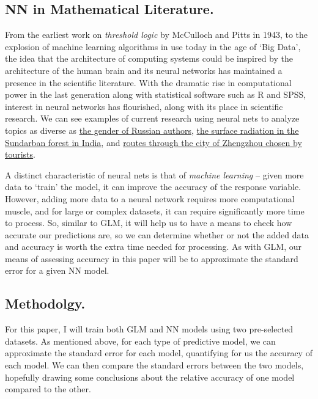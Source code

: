 \documentclass[12pt]{article}
\begin{document}
	\subsection{NN in Mathematical Literature.}
		From the earliest work on \textit{threshold logic} by McCulloch and Pitts in 1943, to the explosion of machine learning algorithms
in use today in the age of `Big Data', the idea that the architecture of computing systems could be inspired by the architecture of the human brain
and its neural networks has maintained a presence in the scientific literature.  With the dramatic rise in computational power in the last 
generation along with statistical software such as R and SPSS, interest in neural networks has flourished, along with its place in scientific
research.  We can see examples of current research using neural nets to analyze topics as diverse as 
\href{https://www.sciencedirect.com/science/article/pii/S1877050918300656}{the gender of Russian authors},
\href{https://www.sciencedirect.com/science/article/pii/S2468203916300024}{the surface radiation in the Sundarban forest in India}, and 
\href{https://www.sciencedirect.com/science/article/pii/S1877050917303617}{routes through the city of Zhengzhou chosen by tourists}.

		
A distinct characteristic of neural nets is that of \textit{machine learning} -- given more data to `train' the model, it can improve the accuracy
of the response variable.  However, adding more data to a neural network requires more computational muscle, and for large or complex datasets,
it can require significantly more time to process.  So, similar to GLM, it will help us to have a means to check how accurate our predictions are,
so we can determine whether or not the added data and accuracy is worth the extra time needed for processing.  As with GLM, our means of assessing
accuracy in this paper will be to approximate the standard error for a given NN model.


	\subsection{Methodolgy.}
		For this paper, I will train both GLM and NN models using two pre-selected datasets.  As mentioned above, for each type of
predictive model, we can approximate the standard error for each model, quantifying for us the accuracy of each model.  We can then compare the 
standard errors between the two models, hopefully drawing some conclusions about the relative accuracy of one model compared to the other.
\end{document}
